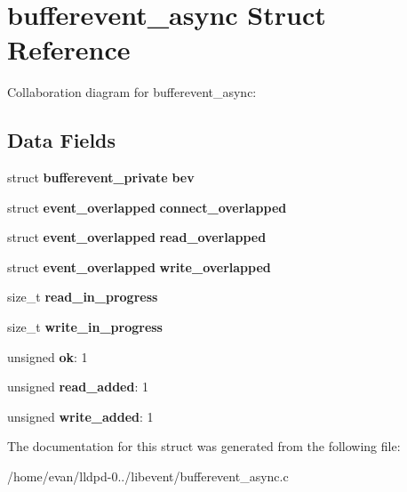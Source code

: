 \section{bufferevent\-\_\-async \-Struct \-Reference}
\label{structbufferevent__async}


\-Collaboration diagram for bufferevent\-\_\-async\-:
\subsection*{\-Data \-Fields}
\begin{DoxyCompactItemize}
\item 
struct {\bf bufferevent\-\_\-private} {\bfseries bev}\label{structbufferevent__async_ac89d86467e491d6accc55fc1aaea8a13}

\item 
struct {\bf event\-\_\-overlapped} {\bfseries connect\-\_\-overlapped}\label{structbufferevent__async_a9dd9e309ab1016677fb57c8547d471b8}

\item 
struct {\bf event\-\_\-overlapped} {\bfseries read\-\_\-overlapped}\label{structbufferevent__async_aab36aec451deae737cac0f3359d14606}

\item 
struct {\bf event\-\_\-overlapped} {\bfseries write\-\_\-overlapped}\label{structbufferevent__async_a6710e099429e53449a02dabef18d71a5}

\item 
size\-\_\-t {\bfseries read\-\_\-in\-\_\-progress}\label{structbufferevent__async_a34fbcd8dc0ea34a12bca06fcc9b8a3fd}

\item 
size\-\_\-t {\bfseries write\-\_\-in\-\_\-progress}\label{structbufferevent__async_a451beecbdf55a3481f91f5fed7f99919}

\item 
unsigned {\bfseries ok}\-: 1\label{structbufferevent__async_a74a79620877f1b66a49ee99e22803b1d}

\item 
unsigned {\bfseries read\-\_\-added}\-: 1\label{structbufferevent__async_a461ca28971a216ff45061c879144c2d7}

\item 
unsigned {\bfseries write\-\_\-added}\-: 1\label{structbufferevent__async_adc2a32ce96f35eaa8270de5d72d214b7}

\end{DoxyCompactItemize}


\-The documentation for this struct was generated from the following file\-:\begin{DoxyCompactItemize}
\item 
/home/evan/lldpd-\/0../libevent/bufferevent\-\_\-async.\-c\end{DoxyCompactItemize}
